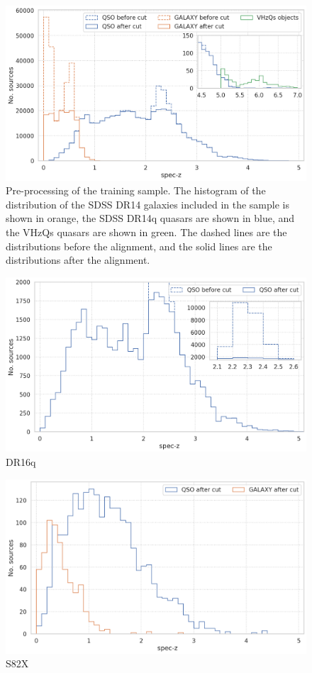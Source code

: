 \documentclass[fleqn,usenatbib]{mnras}
\begin{document}
\begin{figure}
    \centering
    \includegraphics[width=0.95\linewidth]{images/train-peaks-cut.png}
    \caption{Pre-processing of the training sample. The histogram of the distribution of the SDSS DR14 galaxies included in the sample is shown in orange, the SDSS DR14q quasars are shown in blue, and the VHzQs quasars are shown in green. The dashed lines are the distributions before the alignment, and the solid lines are the distributions after the alignment.}
    \label{fig:train-peaks-cut}
\end{figure}

\begin{figure}
    \centering
    \includegraphics[width=0.95\linewidth]{images/data-dist-dr16q-peaks-cut.png}
    \caption{DR16q}
    \label{fig:dr16q-peaks-cut}
\end{figure}

\begin{figure}
    \centering
    \includegraphics[width=0.95\linewidth]{images/data-dist-s82x.png}
    \caption{S82X}
    \label{fig:data-dist-s82x}
\end{figure}
\end{document}
